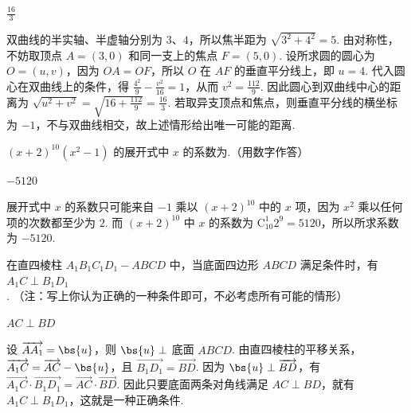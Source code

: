 \begin{answer}
\(\frac{16}{3}\)
\end{answer}

\begin{solution}
双曲线的半实轴、半虚轴分别为 \(3\)、\(4\)，所以焦半距为 \(\sqrt{3^2+4^2}=5\). 由对称性，不妨取顶点 \(A=(3,0)\) 和同一支上的焦点 \(F=(5,0)\). 设所求圆的圆心为 \(O=(u,v)\)，因为 \(OA=OF\)，所以 \(O\) 在 \(AF\) 的垂直平分线上，即 \(u=4\). 代入圆心在双曲线上的条件，得
\(\frac{4^2}{9}-\frac{v^2}{16}=1\)，从而 \(v^2=\frac{112}{9}\). 因此圆心到双曲线中心的距离为
\(\sqrt{u^2+v^2}=\sqrt{16+\frac{112}{9}}=\frac{16}{3}\). 若取异支顶点和焦点，则垂直平分线的横坐标为 \(-1\)，不与双曲线相交，故上述情形给出唯一可能的距离.
\end{solution}

\begin{problem}
\((x + 2)^{10}(x^{2} - 1)\) 的展开式中 \(x\) 的系数为\fillinblank{}.（用数字作答）
\end{problem}

\begin{answer}
\(-5120\)
\end{answer}

\begin{solution}
展开式中 \(x\) 的系数只可能来自 \(-1\) 乘以 \((x+2)^{10}\) 中的 \(x\) 项，因为 \(x^2\) 乘以任何项的次数都至少为 \(2\). 而
\((x+2)^{10}\) 中 \(x\) 的系数为 \(\mathrm C_{10}^{1}2^{9}=5120\)，所以所求系数为 \(-5120\).
\end{solution}

\begin{problem}
在直四棱柱 \(A_{1}B_{1}C_{1}D_{1} - ABCD\) 中，当底面四边形 \(ABCD\) 满足条件\fillinblank{}时，有 \(A_{1}C \perp B_{1}D_{1}\). （注：写上你认为正确的一种条件即可，不必考虑所有可能的情形）
\end{problem}

\begin{answer}
\(AC\perp BD\)
\end{answer}

\begin{solution}
设 \(\overrightarrow{AA_{1}}=\bs{u}\)，则 \(\bs{u}\perp\) 底面 \(ABCD\). 由直四棱柱的平移关系，
\(\overrightarrow{A_{1}C}=\overrightarrow{AC}-\bs{u}\)，且 \(\overrightarrow{B_{1}D_{1}}=\overrightarrow{BD}\). 因为 \(\bs{u}\perp\overrightarrow{BD}\)，有
\(\overrightarrow{A_{1}C}\cdot\overrightarrow{B_{1}D_{1}}=\overrightarrow{AC}\cdot\overrightarrow{BD}\). 因此只要底面两条对角线满足 \(AC\perp BD\)，就有 \(A_{1}C\perp B_{1}D_{1}\)，这就是一种正确条件.
\end{solution}

